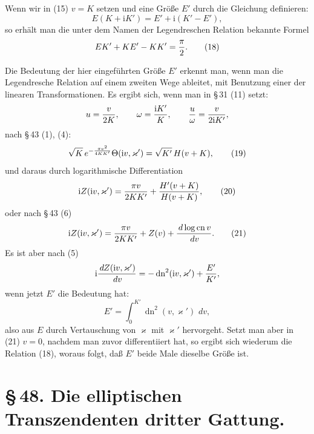 \documentclass[11pt]{article}
\providecommand{\dd}{\,d}
\providecommand{\cn}{\operatorname{cn}}
\providecommand{\dn}{\operatorname{dn}}
\providecommand{\ii}{\mathrm{i}}
\begin{document}
Wenn wir in (15) $v=K$ setzen und eine Größe $E'$ durch die Gleichung definieren:
\begin{equation}
E(K+\ii K')=E'+\ii(K'-E'),
\tag{17}
\end{equation}
so erhält man die unter dem Namen der Legendreschen Relation bekannte Formel
\begin{equation}
EK'+KE'-KK'={\pi\over2}.
\tag{18}
\end{equation}

Die Bedeutung der hier eingeführten Größe $E'$ erkennt man, wenn man die Legendresche Relation auf einem zweiten Wege ableitet, mit Benutzung einer der linearen Transformationen. Es ergibt sich, wenn man in \S\,31 (11) setzt:
\[
u={v\over2K},
\qquad
\omega={\ii K'\over K},
\qquad
{u\over\omega}={v\over2\ii K'},
\]
nach \S\,43 (1), (4):
\begin{equation}
\sqrt{K}\,e^{-{\pi v^2\over4KK'}}\Theta(\ii v,\varkappa')=\sqrt{K'}\,H(v+K),
\tag{19}
\end{equation}
und daraus durch logarithmische Differentiation
\begin{equation}
\ii Z(\ii v,\varkappa')={\pi v\over2KK'}+{H'(v+K)\over H(v+K)},
\tag{20}
\end{equation}
oder nach \S\,43 (6)
\begin{equation}
\ii Z(\ii v,\varkappa')={\pi v\over2KK'}+Z(v)+{\dd\log\cn v\over\dd v}.
\tag{21}
\end{equation}
Es ist aber nach (5)
\[
\ii{\dd Z(\ii v,\varkappa')\over\dd v}=-\dn^2(\ii v,\varkappa')+{E'\over K'},
\]
wenn jetzt $E'$ die Bedeutung hat:
\begin{equation}
E'=\int_0^{K'}\dn^2(v,\varkappa')\,\dd v,
\tag{22}
\end{equation}
also aus $E$ durch Vertauschung von $\varkappa$ mit $\varkappa'$ hervorgeht. Setzt man aber in (21) $v=0$, nachdem man zuvor differentiiert hat, so ergibt sich wiederum die Relation (18), woraus folgt, daß $E'$ beide Male dieselbe Größe ist.

\section*{\S\,48. Die elliptischen Transzendenten dritter Gattung.}
\end{document}
